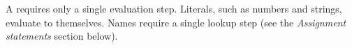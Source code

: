 A  requires only a single evaluation step. Literals,
such as numbers and strings, evaluate to themselves. Names require a single lookup
step (see the \textit{Assignment statements} section below).
